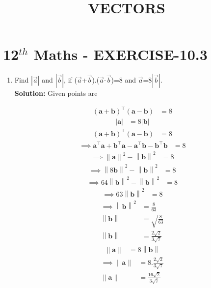 \documentclass[10pt]{article}
\newcommand{\solution}{\noindent \textbf{Solution: }}
\providecommand{\norm}[1]{\left\lVert#1\right\rVert}
\providecommand{\abs}[1]{\left\vert#1\right\vert}
\let\vec\mathbf{}
\begin{document}
\begin{center}
\title{\textbf{VECTORS}}
\date{\vspace{-5ex}} %
\maketitle
\end{center}

\section{12$^{th}$ Maths - EXERCISE-10.3}

\begin{enumerate}
\item Find $\abs{\overrightarrow{a}}$ and $\abs{\overrightarrow{b}}$, if ($\overrightarrow{a}$+$\overrightarrow{b}$)$.$($\overrightarrow{a}$-$\overrightarrow{b}$)=8 and ${\overrightarrow{a}}$=8$\abs{\overrightarrow{b}}$.\\  

\solution
Given  points are

\begin{align}
(\vec{a}+\vec{b})^{\top}(\vec{a}-\vec{b})&=8
\end{align}
\begin{align}
\abs{\vec{a}}&=8\abs{\vec{b}}
\end{align}
\begin{align}
(\vec{a}+\vec{b})^{\top}(\vec{a}-\vec{b})&=8
\end{align}
\begin{align}
\implies\vec{a}^{\top}\vec{a}+\vec{b}^{\top}\vec{a}-\vec{a}^{\top}\vec{b}-\vec{b}^{\top}\vec{b}&=8
\end{align}
\begin{align}
\implies\norm{\vec{a}}^2-\norm{\vec{b}}^2&=8
\end{align}
\begin{align}
\implies\norm{8\vec{b}}^2-\norm{\vec{b}}^2&=8
\end{align}
\begin{align}
\implies64{\norm{\vec{b}}}^2-\norm{\vec{b}}^2&=8
\end{align}
\begin{align}
\implies63{\norm{\vec{b}}}^2&=8
\end{align}
\begin{align}
\implies\norm{\vec{b}}^2&=\frac{8}{63}\\
\norm{\vec{b}}&=\sqrt{\frac{8}{63}}\\
\norm{\vec{b}}&=\frac{2\sqrt{2}}{3\sqrt{7}}
\end{align}
\begin{align}
\norm{\vec{a}}&=8\norm{\vec{b}}
\end{align}
\begin{align}
\implies\norm{\vec{a}}&=8.\frac{2\sqrt{2}}{3\sqrt{7}}\\
\norm{\vec{a}}&=\frac{16\sqrt{2}}{3\sqrt{7}}
\end{align}
\end{enumerate}
\end{document}
